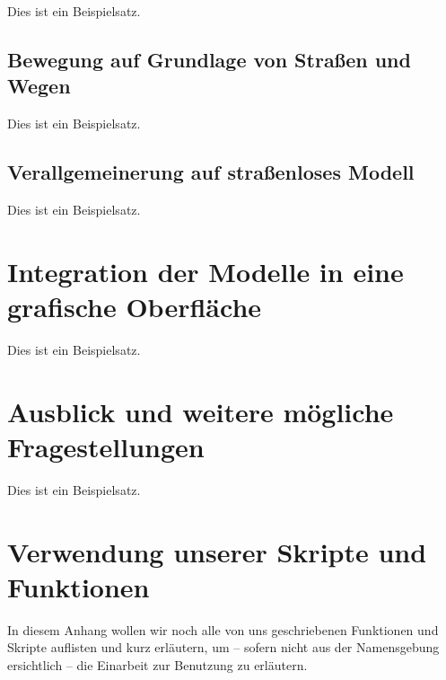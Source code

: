 \documentclass[
    paper=a4,
    DIV14,
    fontsize=12pt,
    pagesize=pdftex,
    toc=bibliographynumbered
]{scrartcl}
\numberwithin{figure}{section}
\numberwithin{equation}{section}
\numberwithin{table}{section}
\begin{document}
Dies ist ein Beispielsatz.

\subsection{Bewegung auf Grundlage von Straßen und Wegen}

Dies ist ein Beispielsatz.

\subsection{Verallgemeinerung auf straßenloses Modell}

Dies ist ein Beispielsatz.

\section{Integration der Modelle in eine grafische Oberfläche}

Dies ist ein Beispielsatz.

\section{Ausblick und weitere mögliche Fragestellungen}

Dies ist ein Beispielsatz.

\newpage
\appendix
\section{Verwendung unserer Skripte und Funktionen}
In diesem Anhang wollen wir noch alle von uns geschriebenen Funktionen und Skripte
auflisten und kurz erläutern, um -- sofern nicht aus der Namensgebung ersichtlich -- die
Einarbeit zur Benutzung zu erläutern.
\end{document}
